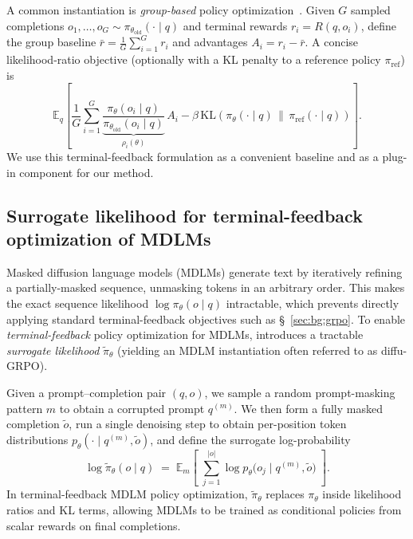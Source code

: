 \documentclass{article}
\theoremstyle{plain}
\theoremstyle{definition}
\theoremstyle{remark}
\begin{document}
A common instantiation is \emph{group-based} policy optimization~\citep{shao2024deepseekmath}.
Given $G$ sampled completions $o_1,\dots,o_G \sim \pi_{\theta_{\text{old}}}(\cdot\mid q)$ and terminal rewards $r_i = R(q,o_i)$, define the group baseline
$\bar r = \frac{1}{G}\sum_{i=1}^G r_i$
and advantages $A_i = r_i - \bar r$.
A concise likelihood-ratio objective (optionally with a KL penalty to a reference policy $\pi_{\text{ref}}$) is
\[
\mathbb{E}_{q}
\left[
\frac{1}{G}\sum_{i=1}^G
\underbrace{\frac{\pi_\theta(o_i\mid q)}{\pi_{\theta_{\text{old}}}(o_i\mid q)}}_{\rho_i(\theta)}
\,A_i
\!-\!\beta\,\mathrm{KL}\!\left(\pi_\theta(\cdot\mid q)\,\|\,\pi_{\text{ref}}(\cdot\mid q)\right)\right].
\]
We use this terminal-feedback formulation as a convenient baseline and as a plug-in component for our method.


\subsection{Surrogate likelihood for terminal-feedback optimization of MDLMs}
\label{sec:bg:diffu}
Masked diffusion language models (MDLMs) generate text by iteratively refining a partially-masked sequence, unmasking tokens in an arbitrary order.
This makes the exact sequence likelihood $\log \pi_\theta(o\!\mid\! q)$ intractable, which prevents directly applying standard terminal-feedback objectives such as \S~\ref{sec:bg:grpo}.
To enable \emph{terminal-feedback} policy optimization for MDLMs, \citet{zhao2025d1} introduces a tractable \emph{surrogate likelihood} $\tilde{\pi}_\theta$ (yielding an MDLM instantiation often referred to as diffu-GRPO).

Given a prompt--completion pair $(q,o)$, we sample a random prompt-masking pattern $m$ to obtain a corrupted prompt $q^{(m)}$.
We then form a fully masked completion $\tilde{o}$, run a single denoising step to obtain per-position token distributions
$p_\theta(\cdot \mid q^{(m)}, \tilde{o})$, and define the surrogate log-probability
\begin{equation}
  \log \tilde{\pi}_\theta(o\mid q)
\;=\;
\mathbb{E}_{m}\!\left[\;\sum_{j=1}^{|o|}
\log p_\theta\!\bigl(o_j \mid q^{(m)}, \tilde{o}\bigr)\;\right].
  \label{eq:global-surrogate}
\end{equation}
In terminal-feedback MDLM policy optimization, $\tilde{\pi}_\theta$ replaces $\pi_\theta$ inside likelihood ratios and KL terms, allowing MDLMs to be trained as conditional policies from scalar rewards on final completions.
\end{document}
